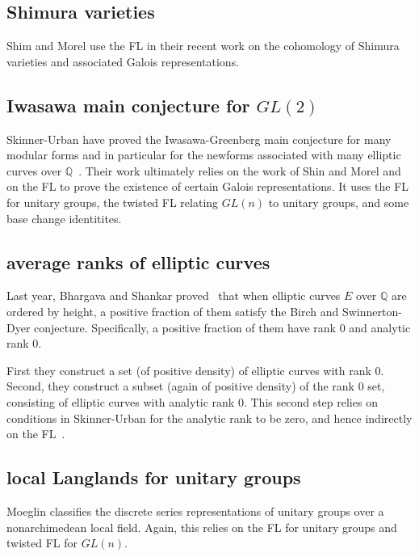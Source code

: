 \documentclass[brochure,english,12pt]{bourbaki}
\newcommand{\ring}[1]{\mathbb{#1}}
\begin{document}

\subsection{Shimura varieties}

Shim and Morel use the FL in their recent work on the cohomology of Shimura varieties and associated
Galois representations.

\subsection{Iwasawa main conjecture for $GL(2)$}

Skinner-Urban have proved the Iwasawa-Greenberg main conjecture for
many modular forms and in particular for the newforms associated with
many elliptic curves over $\ring{Q}$~\cite{SU}.  Their work ultimately
relies on the work of Shin and Morel and on the FL to prove the
existence of certain Galois representations.  It uses the FL for unitary
groups, the twisted FL relating $GL(n)$ to unitary groups, and some
base change identitites.

\subsection{average ranks of elliptic curves}

Last year, Bhargava and Shankar proved~\cite{BS} that
when elliptic curves $E$ over $\ring{Q}$ are ordered
  by height, a positive fraction of them satisfy the Birch and
  Swinnerton-Dyer conjecture.  Specifically, a positive fraction of them
  have rank $0$ and analytic rank $0$.


First they construct a set (of positive
density) of elliptic curves with rank $0$.  Second, they construct a
subset (again of positive density) of the rank $0$ set, consisting of
elliptic curves with analytic rank $0$.  This second step relies on
conditions in Skinner-Urban for the analytic rank to be zero, and hence
indirectly on the FL~\cite[Theorem~2]{SU}.

\subsection{local Langlands for unitary groups}

Moeglin classifies the discrete series representations of unitary
groups over a nonarchimedean local field.  Again, this relies on the
FL for unitary groups and twisted FL for $GL(n)$.
\end{document}
